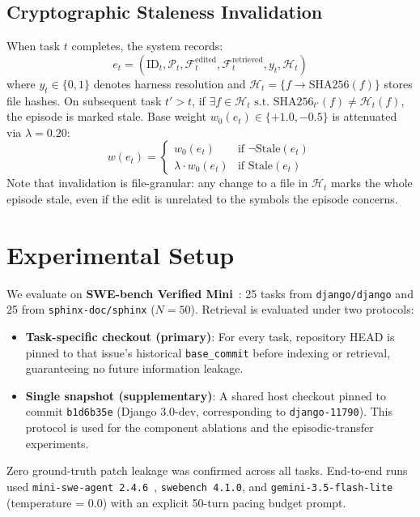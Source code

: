 \documentclass[conference]{IEEEtran}
\begin{document}
\subsection{Cryptographic Staleness Invalidation}
When task $t$ completes, the system records:
\begin{equation}
e_t = \left( \text{ID}_t, \mathcal{P}_t, \mathcal{F}^{\text{edited}}_t, \mathcal{F}^{\text{retrieved}}_t, y_t, \mathcal{H}_t \right)
\end{equation}
where $y_t \in \{0, 1\}$ denotes harness resolution and $\mathcal{H}_t = \{ f \to \text{SHA256}(f) \}$ stores file hashes. On subsequent task $t' > t$, if $\exists f \in \mathcal{H}_t \text{ s.t. } \text{SHA256}_{t'}(f) \neq \mathcal{H}_t(f)$, the episode is marked stale. Base weight $w_0(e_t) \in \{+1.0, -0.5\}$ is attenuated via $\lambda = 0.20$:
\begin{equation}
w(e_t) = \begin{cases} w_0(e_t) & \text{if } \neg\text{Stale}(e_t) \\ \lambda \cdot w_0(e_t) & \text{if } \text{Stale}(e_t) \end{cases}
\end{equation}
Note that invalidation is file-granular: any change to a file in $\mathcal{H}_t$ marks the whole episode stale, even if the edit is unrelated to the symbols the episode concerns.

\section{Experimental Setup}
We evaluate on \textbf{SWE-bench Verified Mini}~\cite{jimenez2024swebench}: 25 tasks from \texttt{django/django} and 25 from \texttt{sphinx-doc/sphinx} ($N=50$). Retrieval is evaluated under two protocols:
\begin{itemize}
    \item \textbf{Task-specific checkout (primary)}: For every task, repository HEAD is pinned to that issue's historical \texttt{base\_commit} before indexing or retrieval, guaranteeing no future information leakage.
    \item \textbf{Single snapshot (supplementary)}: A shared host checkout pinned to commit \texttt{b1d6b35e} (Django 3.0-dev, corresponding to \texttt{django-11790}). This protocol is used for the component ablations and the episodic-transfer experiments.
\end{itemize}
Zero ground-truth patch leakage was confirmed across all tasks. End-to-end runs used \texttt{mini-swe-agent 2.4.6}~\cite{lieret2025minisweagent}, \texttt{swebench 4.1.0}, and \texttt{gemini-3.5-flash-lite} (temperature = 0.0) with an explicit 50-turn pacing budget prompt.
\end{document}
